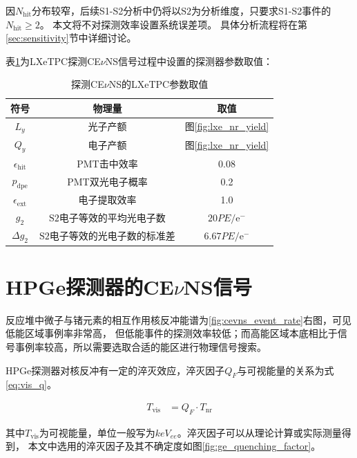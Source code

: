 因$N_\mathrm{hit}$分布较窄，后续S1-S2分析中仍将以$\mathrm{S2}$为分析维度，只要求S1-S2事件的$N_\mathrm{hit}\ge2$。
本文将不对探测效率设置系统误差项。
具体分析流程将在第\ref{sec:sensitivity}节中详细讨论。

表\ref{tab:lxe_tpc_parameters}为LXeTPC探测CE$\nu$NS信号过程中设置的探测器参数取值：

\begin{table}
  \centering
  \caption{探测CE$\nu$NS的LXeTPC参数取值}
  \begin{tabular}{ccc}
    \toprule
    符号 & 物理量 & 取值 \\
    \midrule
    $L_y$ & 光子产额 & 图\ref{fig:lxe_nr_yield} \\
    $Q_y$ & 电子产额 & 图\ref{fig:lxe_nr_yield} \\
    $\epsilon_\mathrm{hit}$ & PMT击中效率 & 0.08 \\
    $p_\mathrm{dpe}$ & PMT双光电子概率 & 0.2 \\
    $\epsilon_\mathrm{ext}$ & 电子提取效率 & 1.0 \\
    $g_2$ & $\mathrm{S2}$电子等效的平均光电子数 & $20\si{PE/\mathrm{e}^-}$ \\
    $\Delta g_2$ & $\mathrm{S2}$电子等效的光电子数的标准差 & $6.67\si{PE/\mathrm{e}^-}$ \\
    \bottomrule
  \end{tabular}
  \label{tab:lxe_tpc_parameters}
\end{table}

\section{HPGe探测器的CE$\nu$NS信号}
\label{sec:hpge_sig}

反应堆中微子与锗元素的相互作用核反冲能谱为\ref{fig:cevns_event_rate}右图，可见低能区域事例率非常高，
但低能事件的探测效率较低；而高能区域本底相比于信号事例率较高，所以需要选取合适的能区进行物理信号搜索。

HPGe探测器对核反冲有一定的淬灭效应，淬灭因子$Q_F$与可视能量的关系为式\ref{eq:vis_q}。

\begin{align}
  \label{eq:vis_q}
  T_\mathrm{vis} &= Q_F\cdot T_\mathrm{nr}
\end{align}

其中$T_\mathrm{vis}$为可视能量，单位一般写为$\si{keV_{ee}}$。淬灭因子可以从理论计算或实际测量得到\cite{zhao_search_2016}，
本文中选用的淬灭因子及其不确定度如图\ref{fig:ge_quenching_factor}。

